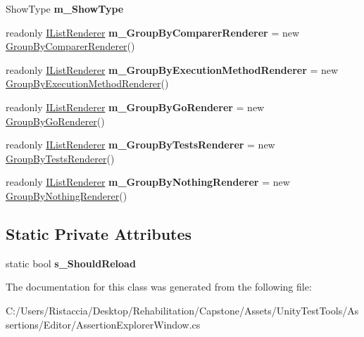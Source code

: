 \begin{DoxyCompactItemize}
Show\+Type {\bfseries m\+\_\+\+Show\+Type}
\item 
\mbox{\label{class_unity_test_1_1_assertion_explorer_window_a5cf99ad755a3b2dc98bf0270fc0f0644}} 
readonly \hyperlink{interface_unity_test_1_1_i_list_renderer}{I\+List\+Renderer} {\bfseries m\+\_\+\+Group\+By\+Comparer\+Renderer} = new \hyperlink{class_unity_test_1_1_group_by_comparer_renderer}{Group\+By\+Comparer\+Renderer}()
\item 
\mbox{\label{class_unity_test_1_1_assertion_explorer_window_a3ef3dfb3b8c4f429326fb0a15c667710}} 
readonly \hyperlink{interface_unity_test_1_1_i_list_renderer}{I\+List\+Renderer} {\bfseries m\+\_\+\+Group\+By\+Execution\+Method\+Renderer} = new \hyperlink{class_unity_test_1_1_group_by_execution_method_renderer}{Group\+By\+Execution\+Method\+Renderer}()
\item 
\mbox{\label{class_unity_test_1_1_assertion_explorer_window_a686370cd49d405c0568a18ba1ce451dd}} 
readonly \hyperlink{interface_unity_test_1_1_i_list_renderer}{I\+List\+Renderer} {\bfseries m\+\_\+\+Group\+By\+Go\+Renderer} = new \hyperlink{class_unity_test_1_1_group_by_go_renderer}{Group\+By\+Go\+Renderer}()
\item 
\mbox{\label{class_unity_test_1_1_assertion_explorer_window_ae516f961100326c2dfd8f62718db46cb}} 
readonly \hyperlink{interface_unity_test_1_1_i_list_renderer}{I\+List\+Renderer} {\bfseries m\+\_\+\+Group\+By\+Tests\+Renderer} = new \hyperlink{class_unity_test_1_1_group_by_tests_renderer}{Group\+By\+Tests\+Renderer}()
\item 
\mbox{\label{class_unity_test_1_1_assertion_explorer_window_a75689918f165dbc51ea0bc6960e1528b}} 
readonly \hyperlink{interface_unity_test_1_1_i_list_renderer}{I\+List\+Renderer} {\bfseries m\+\_\+\+Group\+By\+Nothing\+Renderer} = new \hyperlink{class_unity_test_1_1_group_by_nothing_renderer}{Group\+By\+Nothing\+Renderer}()
\end{DoxyCompactItemize}
\subsection*{Static Private Attributes}
\begin{DoxyCompactItemize}
\item 
\mbox{\label{class_unity_test_1_1_assertion_explorer_window_ae35361bbdb5b42985b881319846e1127}} 
static bool {\bfseries s\+\_\+\+Should\+Reload}
\end{DoxyCompactItemize}


The documentation for this class was generated from the following file\+:\begin{DoxyCompactItemize}
\item 
C\+:/\+Users/\+Ristaccia/\+Desktop/\+Rehabilitation/\+Capstone/\+Assets/\+Unity\+Test\+Tools/\+Assertions/\+Editor/Assertion\+Explorer\+Window.\+cs\end{DoxyCompactItemize}
